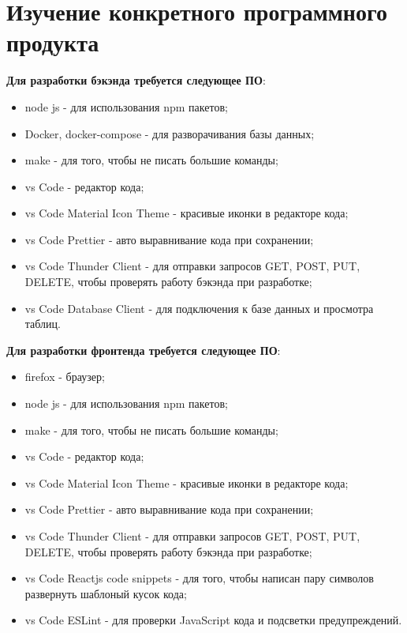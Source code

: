 \newpage
\section{Изучение конкретного программного продукта}

\textbf{Для разработки бэкэнда требуется следующее ПО}:

\begin{itemize}
  \item node js \cite{NodeJS} - для использования npm пакетов;
  \item Docker, docker-compose \cite{Docker} - для разворачивания базы данных;
  \item make \cite{make} - для того, чтобы не писать большие команды;
  \item vs Code \cite{VSCode} - редактор кода;
  \item vs Code Material Icon Theme \cite{VSCodeMaterialIconTheme} - красивые иконки в редакторе кода;
  \item vs Code Prettier \cite{VSCodePrettier} - авто выравнивание кода при сохранении;
  \item vs Code Thunder Client \cite{VSCodeThunderClient} - для отправки запросов GET, POST, PUT, DELETE, чтобы проверять работу бэкэнда при разработке;
  \item vs Code Database Client \cite{VSCodeDatabaseClient} - для подключения к базе данных и просмотра таблиц.
\end{itemize}

\hspace{0pt}

\textbf{Для разработки фронтенда требуется следующее ПО}:

\begin{itemize}
  \item firefox \cite{Firefox} - браузер;
  \item node js \cite{NodeJS} - для использования npm пакетов;
  \item make \cite{make} - для того, чтобы не писать большие команды;
  \item vs Code \cite{VSCode} - редактор кода;
  \item vs Code Material Icon Theme \cite{VSCodeMaterialIconTheme} - красивые иконки в редакторе кода;
  \item vs Code Prettier \cite{VSCodePrettier} - авто выравнивание кода при сохранении;
  \item vs Code Thunder Client \cite{VSCodeThunderClient} - для отправки запросов GET, POST, PUT, DELETE, чтобы проверять работу бэкэнда при разработке;
  \item vs Code Reactjs code snippets \cite{VSCodeReactjscodesnippets} - для того, чтобы написан пару символов развернуть шаблоный кусок кода;
  \item vs Code ESLint \cite{VSCodeESLint} - для проверки JavaScript кода и подсветки предупреждений.
\end{itemize}
